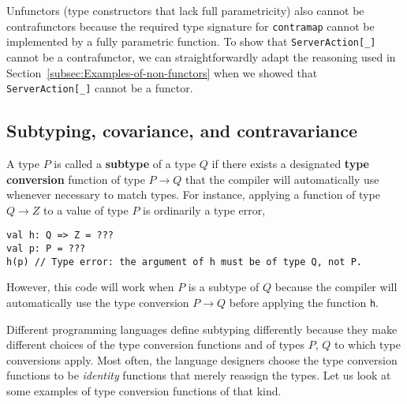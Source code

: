 Unfunctors (type constructors that lack full parametricity)
also cannot be contrafunctors because the required type signature
for \lstinline!contramap! cannot be implemented by a fully parametric
function. To show that \lstinline!ServerAction[_]! cannot be a contrafunctor,
we can straightforwardly adapt the reasoning used in Section~\ref{subsec:Examples-of-non-functors}
when we showed that \lstinline!ServerAction[_]! cannot be a functor.

\subsection{Subtyping, covariance, and contravariance}

A type $P$ is called a \textbf{subtype}
of a type $Q$ if there exists a designated
\textbf{type conversion} function of type $P\rightarrow Q$ that the
compiler will automatically use whenever necessary to match types.
For instance, applying a function of type $Q\rightarrow Z$ to a value
of type $P$ is ordinarily a type error,
\begin{lstlisting}
val h: Q => Z = ???
val p: P = ???
h(p) // Type error: the argument of h must be of type Q, not P.
\end{lstlisting}
However, this code will work when $P$ is a subtype of $Q$ because
the compiler will automatically use the type conversion $P\rightarrow Q$
before applying the function \lstinline!h!.

Different programming languages define subtyping differently because
they make different choices of the type conversion functions and of
types $P$, $Q$ to which type conversions apply. Most often, the
language designers choose the type conversion functions to be \emph{identity}
functions that merely reassign the types. Let us look at some examples
of type conversion functions of that kind. 

